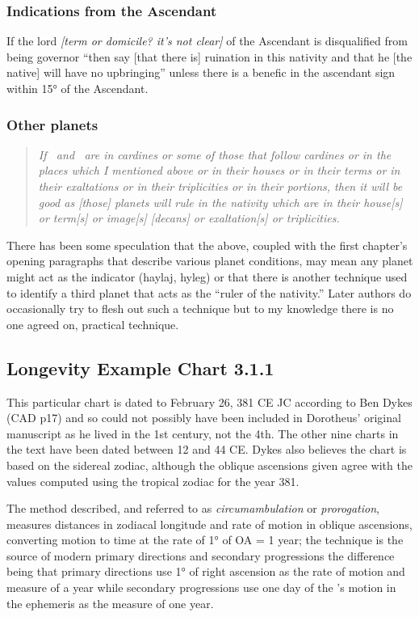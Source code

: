 \subsubsection{Indications from the Ascendant}
If  the lord \textsl{[term or domicile? it's not clear]} of the Ascendant is disqualified from being governor ``then say [that there is] ruination in this nativity and that he [the native] will have no upbringing'' unless there is a benefic in the ascendant sign within 15° of the Ascendant.

\subsubsection{Other planets}
\begin{quote}
\textsl{ If \Mars\, and \Jupiter\, are in cardines or some of those that follow cardines or in the places which I mentioned above or in their houses or in their terms or in their exaltations or in their triplicities or in their portions, then it will be good as [those] planets will rule in the nativity which are in their house[s] or term[s] or image[s] [decans] or exaltation[s] or triplicities.}
\end{quote}

There has been some speculation that the above, coupled with the first chapter's opening paragraphs that describe various planet conditions, may mean any planet might act as the indicator (haylaj, hyleg) or that there is another technique used to identify a third planet that acts as the ``ruler of the nativity.'' Later authors do occasionally try to flesh out such a technique but to my knowledge there is no one agreed on, practical technique.

\newpage
\subsection{Longevity Example Chart 3.1.1}
\vspace{0.5em}
\begin{mdframed}[backgroundcolor=cyan!5, rightmargin=1em, leftmargin=1em]
This particular chart is dated to February 26, 381 CE JC according to Ben Dykes (CAD p17) and so could not possibly have been included in Dorotheus' original manuscript as he lived in the 1st century, not the 4th. The other nine charts in the text have been dated between 12 and 44 CE. Dykes also believes the chart is based on the sidereal zodiac, although the oblique ascensions given agree with the values computed using the tropical zodiac for the year 381.

The method described, and referred to as \textsl{circumambulation} or \textsl{prorogation}, measures distances in zodiacal longitude and rate of motion in oblique ascensions, converting motion to time at the rate of 1° of OA = 1 year; the technique is the source of modern primary directions and secondary progressions the difference being that primary directions use 1° of right ascension as the rate of motion and measure of a year while secondary progressions use one day of the \Sun's motion in the ephemeris as the measure of one year.
\end{mdframed}


